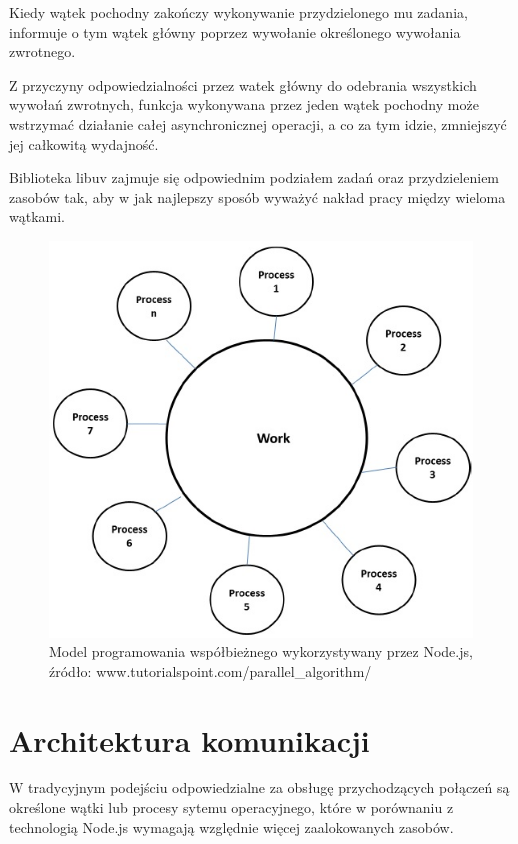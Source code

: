 \documentclass[12pt]{report}
\begin{document}
Kiedy wątek pochodny zakończy wykonywanie przydzielonego mu zadania, informuje o tym wątek główny poprzez wywołanie określonego wywołania zwrotnego.

Z przyczyny odpowiedzialności przez watek główny do odebrania wszystkich wywołań zwrotnych, funkcja wykonywana przez jeden wątek pochodny może wstrzymać działanie całej asynchronicznej operacji, a co za tym idzie, zmniejszyć jej całkowitą wydajność.

Biblioteka libuv zajmuje się odpowiednim podziałem zadań oraz przydzieleniem zasobów tak, aby w jak najlepszy sposób wyważyć nakład pracy między wieloma wątkami.

\newpage
\begin{figure}[!hb]
\centering
\includegraphics[width=\textwidth,height=\textheight,keepaspectratio]{thread.png} 
\caption{Model programowania współbieżnego wykorzystywany przez Node.js, źródło: www.tutorialspoint.com/parallel\_algorithm/}
\end{figure}

\section{Architektura komunikacji}
W tradycyjnym podejściu odpowiedzialne za obsługę przychodzących połączeń są określone wątki lub procesy sytemu operacyjnego, które w porównaniu z technologią Node.js wymagają względnie więcej zaalokowanych zasobów.
\end{document}
